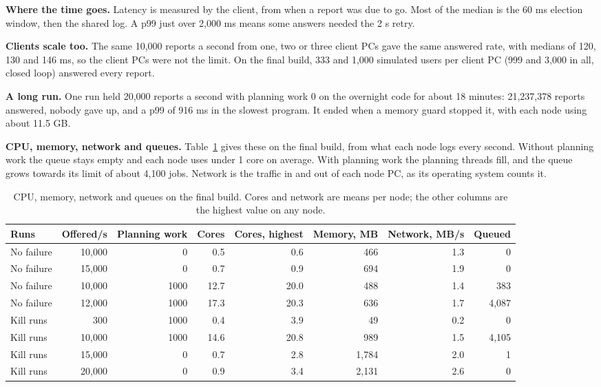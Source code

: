 \textbf{Where the time goes.} Latency is measured by the client, from when a report was due to go. Most of the median is the 60 ms election window, then the shared log. A p99 just over 2,000 ms means some answers needed the 2 s retry.

\textbf{Clients scale too.} The same 10,000 reports a second from one, two or three client PCs gave the same answered rate, with medians of 120, 130 and 146 ms, so the client PCs were not the limit. On the final build, 333 and 1,000 simulated users per client PC (999 and 3,000 in all, closed loop) answered every report.

\textbf{A long run.} One run held 20,000 reports a second with planning work 0 on the overnight code for about 18 minutes: 21,237,378 reports answered, nobody gave up, and a p99 of 916 ms in the slowest program. It ended when a memory guard stopped it, with each node using about 11.5 GB.

\textbf{CPU, memory, network and queues.} Table~\ref{tab:resources} gives these on the final build, from what each node logs every second. Without planning work the queue stays empty and each node uses under 1 core on average. With planning work the planning threads fill, and the queue grows towards its limit of about 4,100 jobs. Network is the traffic in and out of each node PC, as its operating system counts it.

\begin{table}[!htb]
\centering\small
\caption{CPU, memory, network and queues on the final build. Cores and network are means per node; the other columns are the highest value on any node.}
\label{tab:resources}
\begin{tabular}{@{}lrrrrrrr@{}}
\toprule
Runs & Offered/s & Planning work & Cores & Cores, highest & Memory, MB & Network, MB/s & Queued \\
\midrule
No failure & 10,000 & 0 & 0.5 & 0.6 & 466 & 1.3 & 0 \\
No failure & 15,000 & 0 & 0.7 & 0.9 & 694 & 1.9 & 0 \\
No failure & 10,000 & 1000 & 12.7 & 20.0 & 488 & 1.4 & 383 \\
No failure & 12,000 & 1000 & 17.3 & 20.3 & 636 & 1.7 & 4,087 \\
Kill runs & 300 & 1000 & 0.4 & 3.9 & 49 & 0.2 & 0 \\
Kill runs & 10,000 & 1000 & 14.6 & 20.8 & 989 & 1.5 & 4,105 \\
Kill runs & 15,000 & 0 & 0.7 & 2.8 & 1,784 & 2.0 & 1 \\
Kill runs & 20,000 & 0 & 0.9 & 3.4 & 2,131 & 2.6 & 0 \\
\bottomrule
\end{tabular}
\end{table}

